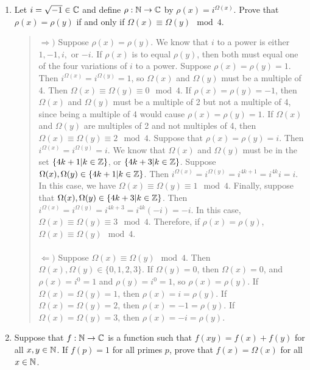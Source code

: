 \documentclass{hw}
\begin{document}
\begin{enumerate}
\item Let $i=\sqrt{-1}\in\mathbb{C}$ and define $\rho:\mathbb{N}\to\mathbb{C}$ by $\rho(x)=i^{\Omega(x)}$. Prove that
$\rho(x)=\rho(y)$ if and only if $\Omega(x)\equiv\Omega(y)\mod4$.
\begin{quote}
$\Rightarrow)$ Suppose $\rho(x)=\rho(y)$. We know that $i$ to a power is either $1,-1,i,$ or $-i$.
If $\rho(x)$ is to equal $\rho(y)$, then both must equal one of the four variations of $i$ to a
power. Suppose $\rho(x)=\rho(y)=1$. Then $i^{\Omega(x)}=i^{\Omega(y)}=1$, so $\Omega(x)$ and
$\Omega(y)$ must be a multiple of 4. Then $\Omega(x)\equiv\Omega(y)\equiv0\mod4$. If
$\rho(x)=\rho(y)=-1$, then $\Omega(x)$ and $\Omega(y)$ must be a multiple of 2 but not a multiple
of 4, since being a multiple of 4 would cause $\rho(x)=\rho(y)=1$. If $\Omega(x)$ and $\Omega(y)$
are multiples of 2 and not multiples of 4, then $\Omega(x)\equiv\Omega(y)\equiv2\mod4$. Suppose that
$\rho(x)=\rho(y)=i$. Then $i^{\Omega(x)}=i^{\Omega(y)}=i$. We know that $\Omega(x)$ and $\Omega(y)$
must be in the set $\{ 4k+1|k\in\mathbb{Z}\}$, or $\{ 4k+3|k\in\mathbb{Z}\}$. Suppose
$\Omega(x),\Omega(y)\in\{ 4k+1|k\in\mathbb{Z}\}$. Then $i^{\Omega(x)}=i^{\Omega(y)}=i^{4k+1}=i^{4k}i=i$.
In this case, we have $\Omega(x)\equiv\Omega(y)\equiv1\mod4$. Finally, suppose that
$\Omega(x),\Omega(y)\in\{ 4k+3|k\in\mathbb{Z}\}$. Then $i^{\Omega(x)}=i^{\Omega(y)}=i^{4k+3}=i^{4k}(-i)=-i$.
In this case, $\Omega(x)\equiv\Omega(y)\equiv3\mod4$. Therefore, if $\rho(x)=\rho(y)$,
$\Omega(x)\equiv\Omega(y)\mod4$.\\\\

$\Leftarrow)$ Suppose $\Omega(x)\equiv\Omega(y)\mod4$. Then $\Omega(x),\Omega(y)\in\{0,1,2,3\}$.
If $\Omega(y)=0$, then $\Omega(x)=0$, and $\rho(x)=i^{0}=1$ and $\rho(y)=i^{0}=1$, so $\rho(x)=\rho(y)$.
If $\Omega(x)=\Omega(y)=1$, then  $\rho(x)=i=\rho(y)$. If $\Omega(x)=\Omega(y)=2$, then
$\rho(x)=-1=\rho(y)$. If $\Omega(x)=\Omega(y)=3$, then $\rho(x)=-i=\rho(y)$.
\end{quote}

\item Suppose that $f:\mathbb{N}\to\mathbb{C}$ is a function such that $f(xy)=f(x)+f(y)$ for all $x,y\in\mathbb{N}$. If
$f(p)=1$ for all primes $p$, prove that $f(x)=\Omega(x)$ for all $x\in\mathbb{N}$.


\end{enumerate}
\end{document}
